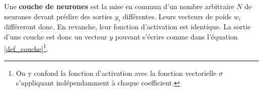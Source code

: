 \documentclass[12pt, twoside]{report}
\begin{document}
Une \textbf{couche de neurones} est la mise en commun d'un nombre arbitraire $N$ de neurones devant prédire des sorties $y_i$ différentes. Leurs vecteurs de poids $w_i$ différeront donc. En revanche, leur fonction d'activation est identique. La sortie d'une couche est donc un vecteur $y$ pouvant s'écrire comme dans l'équation \ref{def_couche}\footnote{On y confond la fonction d'activation avec la fonction vectorielle $\sigma$ s'appliquant indépendamment à chaque coefficient.}.
\end{document}
